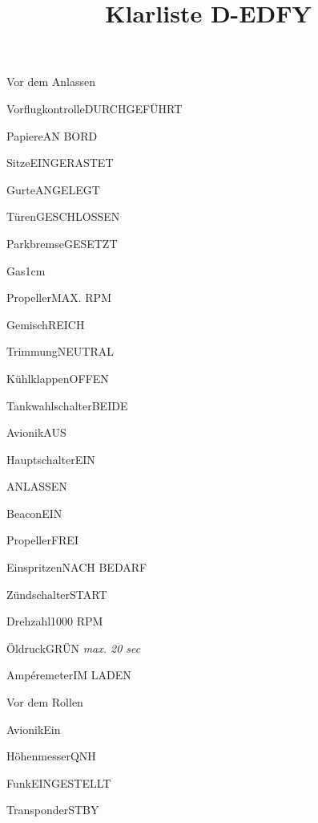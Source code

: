 \def\papersize{4}





\title{Klarliste D-EDFY}

\begin{task}
  \begin{checklist}{Vor dem Anlassen}
    \item{Vorflugkontrolle}{DURCHGEFÜHRT}
    \item{Papiere}{AN BORD}
    \item{Sitze}{EINGERASTET}
    \item{Gurte}{ANGELEGT}
    \item{Türen}{GESCHLOSSEN}
    \item{Parkbremse}{GESETZT}
    \item{Gas}{1cm}
    \item{Propeller}{MAX. RPM}
    \item{Gemisch}{REICH}
    \item{Trimmung}{NEUTRAL}
    \item{Kühlklappen}{OFFEN}
    \item{Tankwahlschalter}{BEIDE}
    \item{Avionik}{AUS}
    \item{Hauptschalter}{EIN}
  \end{checklist}
\end{task}

\begin{task}
  \begin{checklist}{ANLASSEN}
    \item{Beacon}{EIN}
    \item{Propeller}{FREI}
    \item{Einspritzen}{NACH BEDARF}
    \item{Zündschalter}{START}
    \item{Drehzahl}{1000 RPM}
    \item{Öldruck}{GRÜN \textit{max. 20 sec}}
    \item{Ampéremeter}{IM LADEN}
  \end{checklist}
\end{task}

\begin{task}
  \begin{checklist}{Vor dem Rollen}
    \item{Avionik}{Ein}
    \item{Höhenmesser}{QNH}
    \item{Funk}{EINGESTELLT}
    \item{Transponder}{STBY}
  \end{checklist}
\end{task}

